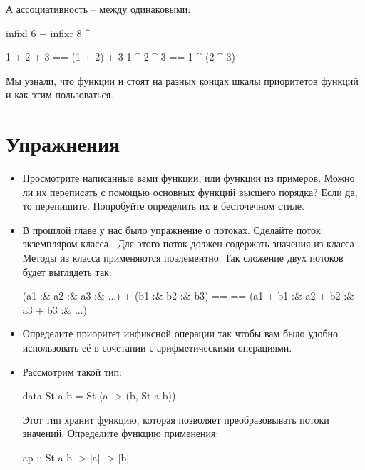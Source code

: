 А ассоциативность -- между одинаковыми:

\begin{code}
infixl 6 +
infixr 8 ^

1 + 2 + 3 == (1 + 2) + 3    
1 ^ 2 ^ 3 ==  1 ^ (2 ^ 3)  
\end{code}

Мы узнали, что функции \In{($)} и  стоят на разных
концах шкалы приоритетов функций и как этим пользоваться. 

\section{Упражнения}

\begin{itemize}

\item Просмотрите написанные вами функции, или функции
        из примеров. Можно ли их переписать с помощью
        основных функций высшего порядка? 
        Если да, то перепишите. Попробуйте определить
        их в бесточечном стиле.

\item В прошлой главе у нас было упражнение о потоках.
        Сделайте поток экземпляром класса .
        Для этого поток должен содержать значения из класса .
        Методы из класса  применяются поэлементно.
        Так сложение двух потоков будет выглядеть так:

\begin{code}
    (a1 :& a2 :& a3 :& ...) + (b1 :& b2 :& b3) ==
==  (a1 + b1 :& a2 + b2 :& a3 + b3 :& ...)
\end{code}


\item Определите приоритет инфиксной операции \In{(:&)}  
        так чтобы вам было удобно использовать её в сочетании
        с арифметическими операциями.

\item Рассмотрим такой тип:

\begin{code}
data St a b = St (a -> (b, St a b))
\end{code}

    Этот тип хранит функцию, которая позволяет преобразовывать
    потоки значений. Определите функцию применения:

\begin{code}
ap :: St a b -> [a] -> [b]
\end{code}


\end{itemize}
